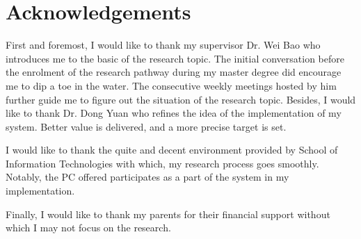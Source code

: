 \chapter*{Acknowledgements}

First and foremost, I would like to thank my supervisor Dr. Wei Bao who introduces me to the basic of the research topic. The initial conversation before the enrolment of the research pathway during my master degree did encourage me to dip a toe in the water. The consecutive weekly meetings hosted by him further guide me to figure out the situation of the research topic. Besides, I would like to thank Dr. Dong Yuan who refines the idea of the implementation of my system. Better value is delivered, and a more precise target is set.

I would like to thank the quite and decent environment provided by School of Information Technologies with which, my research process goes smoothly. Notably, the PC offered participates as a part of the system in my implementation.

Finally, I would like to thank my parents for their financial support without which I may not focus on the research.